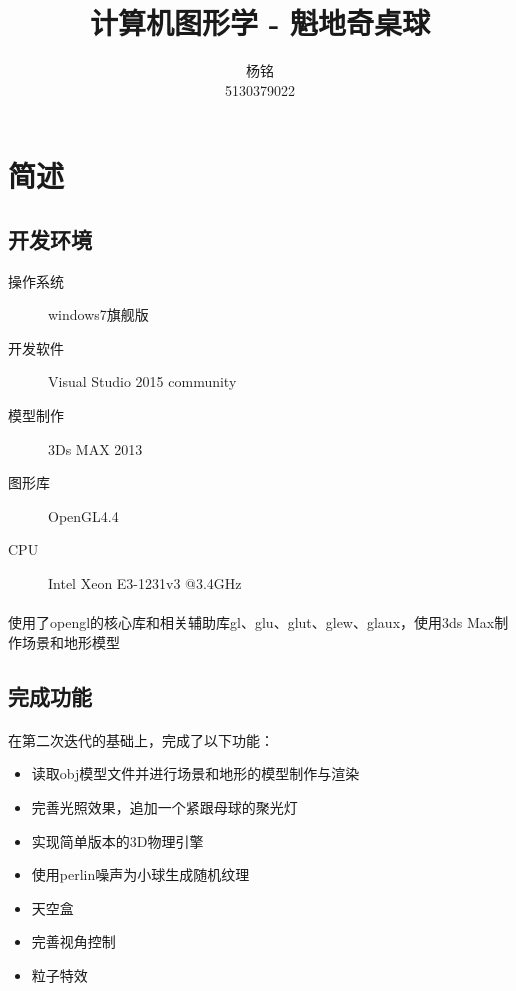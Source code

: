 \documentclass{article}
\author{杨铭\\5130379022}
\title{计算机图形学 - 魁地奇桌球}
\begin{document}
    \maketitle
    \renewcommand{\contentsname}{目\ \ 录}
    \tableofcontents
    \section{简述}
        \subsection{开发环境}
            \begin{description}
              \item[操作系统] windows7旗舰版
              \item[开发软件] Visual Studio 2015 community
              \item[模型制作] 3Ds MAX 2013
              \item[图形库] OpenGL4.4
              \item[CPU] Intel Xeon E3-1231v3 @3.4GHz
            \end{description}
            \paragraph{}使用了opengl的核心库和相关辅助库gl、glu、glut、glew、glaux，使用3ds Max制作场景和地形模型
        \subsection{完成功能}
            \paragraph{}
            在第二次迭代的基础上，完成了以下功能：
            \begin{itemize}
              \item 读取obj模型文件并进行场景和地形的模型制作与渲染
              \item 完善光照效果，追加一个紧跟母球的聚光灯
              \item 实现简单版本的3D物理引擎
              \item 使用perlin噪声为小球生成随机纹理
              \item 天空盒
              \item 完善视角控制
              \item 粒子特效
            \end{itemize}
\end{document}
